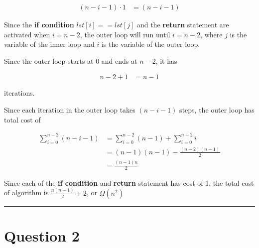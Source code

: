 \documentclass[12pt]{article}
\begin{document}
\begin{enumerate}[a.]
    \begin{align}
        (n-i-1) \cdot 1 &= (n-i-1)
    \end{align}

    \bigskip

    Since the \textbf{if condition} $lst[i] == lst[j]$ and the \textbf{return}
    statement are activated when $i=n-2$, the outer loop will run until $i=n-2$,
    where $j$ is the variable of the inner loop and $i$ is the variable of
    the outer loop.

    \bigskip

    Since the outer loop starts at 0 and ends at $n-2$, it has

    \begin{align}
        n-2+1 &= n-1
    \end{align}

    iterations.

    \bigskip

    Since each iteration in the outer loop takes $(n-i-1)$ steps, the outer
    loop has total cost of

    \begin{align}
        \sum\limits_{i=0}^{n-2} (n-i-1) &= \sum\limits_{i=0}^{n-2} (n-1) + \sum\limits_{i=0}^{n-2} i\\
        &= (n-1)(n-1) - \frac{(n-2)(n-1)}{2}\\
        &= \frac{(n-1)n}{2}
    \end{align}

    Since each of the \textbf{if condition} and \textbf{return} statement has cost of 1,
    the total cost of algorithm is $\frac{n(n-1)}{2} + 2$, or $\Omega(n^2)$

    \noindent\rule{\textwidth}{1pt}
\end{enumerate}

\section*{Question 2}
\end{document}
